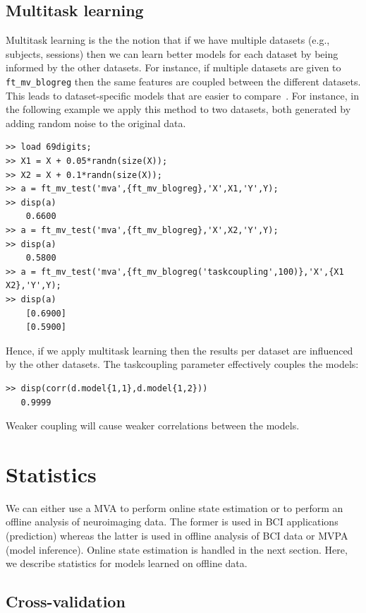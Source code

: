 \documentclass{article}
\renewcommand{\t}[1]{{\tt #1}}
\begin{document}
\subsection{Multitask learning}

Multitask learning is the the notion that if we have multiple datasets (e.g., subjects, sessions) then we can learn better models for each dataset by being informed by the other datasets. For instance, if multiple datasets are given to \t{ft\_mv\_blogreg} then the same features are coupled between the different datasets. This leads to dataset-specific models that are easier to compare~\cite{gerven2010b}. For instance, in the following example we apply this method to two datasets, both generated by adding random noise to the original data.
\begin{verbatim}
>> load 69digits;
>> X1 = X + 0.05*randn(size(X));
>> X2 = X + 0.1*randn(size(X));
>> a = ft_mv_test('mva',{ft_mv_blogreg},'X',X1,'Y',Y);
>> disp(a)
    0.6600
>> a = ft_mv_test('mva',{ft_mv_blogreg},'X',X2,'Y',Y);
>> disp(a)
    0.5800
>> a = ft_mv_test('mva',{ft_mv_blogreg('taskcoupling',100)},'X',{X1 X2},'Y',Y);
>> disp(a)
    [0.6900]
    [0.5900]
\end{verbatim}
Hence, if we apply multitask learning then the results per dataset are influenced by the other datasets. The taskcoupling parameter effectively couples the models:
\begin{verbatim}
>> disp(corr(d.model{1,1},d.model{1,2}))
   0.9999
\end{verbatim}
Weaker coupling will cause weaker correlations between the models.

\newpage

\section{Statistics}

We can either use a MVA to perform online state estimation or to perform an offline analysis of neuroimaging data. The former is used in BCI applications (prediction) whereas the latter is used in offline analysis of BCI data or MVPA (model inference). Online state estimation is handled in the next section. Here, we describe statistics for models learned on offline data.

\subsection{Cross-validation}
\end{document}
